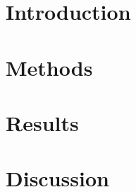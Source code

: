 \documentclass[twocolumn]{article}
\begin{document}
\saythanks

\setlength{\baselineskip}{12pt plus.2pt}

\section*{Introduction}

\section*{Methods}

\section*{Results} 

\section*{Discussion}


\renewcommand{\refname}{\spacedlowsmallcaps{References}} %


\end{document}
